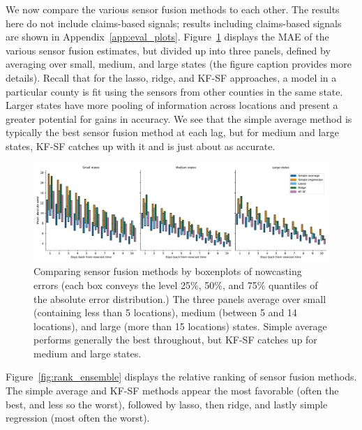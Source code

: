 \documentclass[sts]{imsart}
\theoremstyle{plain}
\theoremstyle{definition}
\theoremstyle{remark}
\begin{document}
We now compare the various sensor fusion methods to each other. The results here
do not include claims-based signals; results including claims-based signals are
shown in Appendix~\ref{app:eval_plots}. Figure~\ref{fig:mae_sml} displays the
MAE of the various sensor fusion estimates, but divided up into three panels,
defined by averaging over small, medium, and large states (the figure caption
provides more details). Recall that for the lasso, ridge, and KF-SF approaches,
a model in a particular county is fit using the sensors from other counties in
the same state. Larger states have more pooling of information across locations
and present a greater potential for gains in accuracy. We see that the simple
average method is typically the best sensor fusion method at each lag, but for
medium and large states, KF-SF catches up with it and is just about as accurate.

\begin{figure}[tb]
\centering
\includegraphics[width=0.95\linewidth]{./figures/boxenplot_no_claims.pdf}
\caption{Comparing sensor fusion methods by boxenplots of nowcasting
  errors (each box conveys the level 25\%, 50\%, and 75\% quantiles of the  
  absolute error distribution.) The three panels average over small (containing
  less than 5 locations), medium (between 5 and 14 locations), and large (more
  than 15 locations) states. Simple average performs generally the best
  throughout, but KF-SF catches up for medium and large states.}  
	\label{fig:mae_sml}
\end{figure}

Figure~\ref{fig:rank_ensemble} displays the relative ranking of sensor fusion
methods. The simple average and KF-SF methods appear the most favorable
(often the best, and less so the worst), followed by lasso, then ridge, and 
lastly simple regression (most often the worst).   
\end{document}
